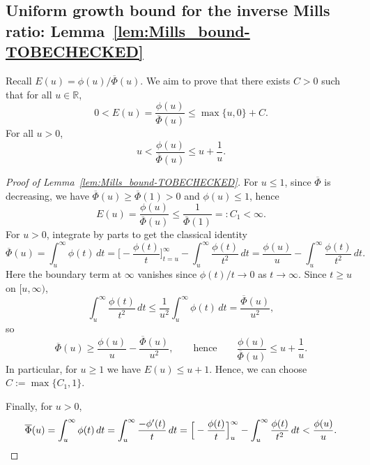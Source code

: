 \documentclass[11pt]{article}
\begin{document}
\subsection{Uniform growth bound for the inverse Mills ratio: Lemma~\ref{lem:Mills_bound-TOBECHECKED}}
Recall $E(u)=\phi(u)/\overline{\Phi}(u)$. We aim to prove that there exists $C>0$ such that for all
$u\in\mathbb R$,
\[
0<E(u)=\frac{\phi(u)}{\overline{\Phi}(u)} \le \max\{u,0\} + C.
\]
For all $u>0$,
\[
u<\frac{\phi(u)}{\overline{\Phi}(u)}\le u+\frac{1}{u}.
\]
\begin{proof}[Proof of Lemma~\ref{lem:Mills_bound-TOBECHECKED}]
For $u\le 1$, since $\overline{\Phi}$ is decreasing, we have $\overline{\Phi}(u)\ge \overline{\Phi}(1)>0$ and
$\phi(u)\le 1$, hence
\[
E(u)=\frac{\phi(u)}{\overline{\Phi}(u)}\le \frac{1}{\overline{\Phi}(1)}=:C_1<\infty.
\]
For $u>0$, integrate by parts to get the classical identity
\[
\overline{\Phi}(u)=\int_u^\infty \phi(t)\,dt
=\Big[-\frac{\phi(t)}{t}\Big]_{t=u}^\infty-\int_u^\infty\frac{\phi(t)}{t^2}\,dt
=\frac{\phi(u)}{u}-\int_u^\infty\frac{\phi(t)}{t^2}\,dt.
\]
Here the boundary term at $\infty$ vanishes since $\phi(t)/t\to 0$ as $t\to\infty$.
Since $t\ge u$ on $[u,\infty)$,
\[
\int_u^\infty \frac{\phi(t)}{t^2}\,dt\le \frac{1}{u^2}\int_u^\infty \phi(t)\,dt
=\frac{\overline{\Phi}(u)}{u^2},
\]
so
\begin{equation}\label{eq: two-sided mills}
 \overline{\Phi}(u)\ge \frac{\phi(u)}{u}-\frac{\overline{\Phi}(u)}{u^2},
\qquad\text{hence}\qquad
\frac{\phi(u)}{\overline{\Phi}(u)}\le u+\frac{1}{u}.
\end{equation}
In particular, for $u\ge 1$ we have $E(u)\le u+1$. Hence, we can choose $C:=\max\{C_1,1\}$.

Finally, for $u>0$,
\[ \overline{\Phi}(u)= \int_u^\infty \phi(t)\,dt=\int_u^\infty \frac{-\phi'(t)}{t}\,dt
=\Big[-\frac{\phi(t)}{t}\Big]_{u}^{\infty}-\int_u^\infty \frac{\phi(t)}{t^{2}}\,dt\\
< \frac{\phi(u)}u.\]

\end{proof}
\end{document}
